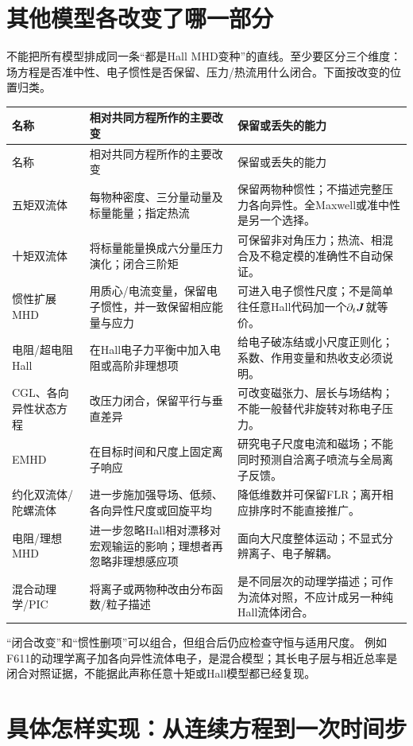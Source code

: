 \section{其他模型各改变了哪一部分}
不能把所有模型排成同一条“都是Hall MHD变种”的直线。至少要区分三个维度：场方程是否准中性、电子惯性是否保留、压力/热流用什么闭合。下面按改变的位置归类。
\begin{longtable}{P{27mm}P{61mm}P{60mm}}
\toprule 名称 & 相对共同方程所作的主要改变 & 保留或丢失的能力\\\midrule\endfirsthead
\toprule 名称 & 相对共同方程所作的主要改变 & 保留或丢失的能力\\\midrule\endhead
五矩双流体 & 每物种密度、三分量动量及标量能量；指定热流 & 保留两物种惯性；不描述完整压力各向异性。全Maxwell或准中性是另一个选择。\\
十矩双流体 & 将标量能量换成六分量压力演化；闭合三阶矩 & 可保留非对角压力；热流、相混合及不稳定模的准确性不自动保证。\\
惯性扩展MHD & 用质心/电流变量，保留电子惯性，并一致保留相应能量与应力 & 可进入电子惯性尺度；不是简单往任意Hall代码加一个$\partial_t\bm{J}$就等价。\\
电阻/超电阻Hall & 在Hall电子力平衡中加入电阻或高阶非理想项 & 给电子破冻结或小尺度正则化；系数、作用变量和热收支必须说明。\\
CGL、各向异性状态方程 & 改压力闭合，保留平行与垂直差异 & 可改变磁张力、层长与场结构；不能一般替代非旋转对称电子压力。\\
EMHD & 在目标时间和尺度上固定离子响应 & 研究电子尺度电流和磁场；不能同时预测自洽离子喷流与全局离子反馈。\\
约化双流体/陀螺流体 & 进一步施加强导场、低频、各向异性尺度或回旋平均 & 降低维数并可保留FLR；离开相应排序时不能直接推广。\\
电阻/理想MHD & 进一步忽略Hall相对漂移对宏观输运的影响；理想者再忽略非理想感应项 & 面向大尺度整体运动；不显式分辨离子、电子解耦。\\
混合动理学/PIC & 将离子或两物种改由分布函数/粒子描述 & 是不同层次的动理学描述；可作为流体对照，不应计成另一种纯Hall流体闭合。\\
\bottomrule
\end{longtable}
“闭合改变”和“惯性删项”可以组合，但组合后仍应检查守恒与适用尺度。
例如F611的动理学离子加各向异性流体电子，是混合模型；其长电子层与相近总率是闭合对照证据，不能据此声称任意十矩或Hall模型都已经复现。\citep{F611,Wang2015,Andres2016}

\section{具体怎样实现：从连续方程到一次时间步}
